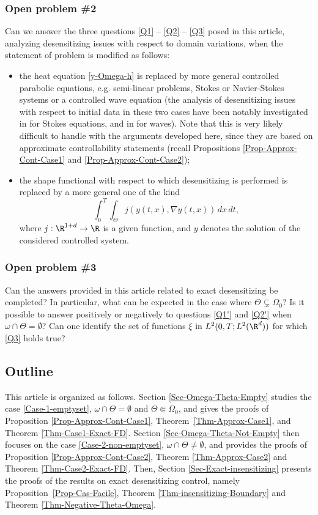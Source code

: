 \subsubsection*{Open problem \#{2}} Can we answer the three questions {\ref{Q1} -- \ref{Q2} -- \ref{Q3}} posed in this article, analyzing desensitizing issues with respect to domain variations, when the statement of problem is modified as follows:
\begin{itemize}
\item the heat equation \eqref{y-Omega-h} is replaced by more general controlled parabolic equations, e.g. semi-linear problems, Stokes or Navier-Stokes systems or a controlled wave equation (the analysis of desensitizing issues with respect to initial data in these two cases have been notably investigated in \cite{Guerrero} for Stokes equations, and in \cite{Tebou1,Tebou2,Alabau-Boussouira} for waves). Note that this is very likely difficult to handle with the arguments deve\-loped here, since they are based on approximate controllability statements (recall Propositions \ref{Prop-Approx-Cont-Case1} and \ref{Prop-Approx-Cont-Case2});

\item the shape functional with respect to which desensitizing is performed is replaced by a more general one of the kind
\[
\int_0^T\int_{\Theta}j(y(t,x),\nabla y(t,x))\, dx\,dt,
\]
where $j:\R^{1+d} \to \R$ is a given function, and $y$ denotes the solution of the considered controlled system.
\end{itemize}

\subsubsection*{Open problem \#{3}} Can the answers provided in this article related to exact desensitizing be completed? In particular, what can be expected in the case where $\Theta \subsetneq \Omega_0$? Is it possible to answer positively or negatively to questions \ref{Q1'} and \ref{Q2'} when $\omega \cap \Theta= \emptyset$? Can one identify the set of functions $\xi$ in $L^2(0,T; L^2(\R^d))$ for which \ref{Q3} holds true?

\subsection{Outline}

This article is organized as follows. Section \ref{Sec-Omega-Theta-Empty} studies the case \eqref{Case-1-emptyset}, \ie $\omega \cap \Theta = \emptyset$ and $\Theta \Subset \Omega_0$, and gives the proofs of Proposition \ref{Prop-Approx-Cont-Case1}, Theorem~\ref{Thm-Approx-Case1}, and Theorem \ref{Thm-Case1-Exact-FD}. Section \ref{Sec-Omega-Theta-Not-Empty} then focuses on the case \eqref{Case-2-non-emptyset}, \ie $\omega \cap \Theta \neq \emptyset$, and provides the proofs of Proposition \ref{Prop-Approx-Cont-Case2}, Theorem \ref{Thm-Approx-Case2} and Theorem \ref{Thm-Case2-Exact-FD}. Then, Section \ref{Sec-Exact-insensitizing} presents the proofs of the results on exact desensitizing control, namely Proposition~\ref{Prop-Cas-Facile}, Theorem \ref{Thm-insensitizing-Boundary} and Theorem \ref{Thm-Negative-Theta-Omega}.

